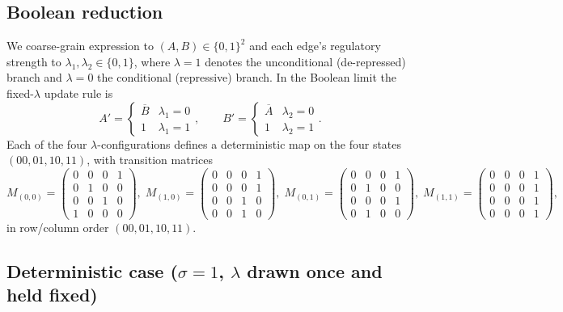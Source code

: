 \subsection{Boolean reduction}
 
We coarse-grain expression to $(A,B)\in\{0,1\}^2$ and each edge's regulatory
strength to $\lambda_{1},\lambda_{2}\in\{0,1\}$, where $\lambda=1$ denotes the
unconditional (de-repressed) branch and $\lambda=0$ the conditional (repressive)
branch. In the Boolean limit the fixed-$\lambda$ update rule is
\begin{equation}
  A' = \begin{cases}\overline{B} & \lambda_{1}=0\\[2pt] 1 & \lambda_{1}=1\end{cases},
  \qquad
  B' = \begin{cases}\overline{A} & \lambda_{2}=0\\[2pt] 1 & \lambda_{2}=1\end{cases}.
  \label{eq:boolupdate}
\end{equation}
Each of the four $\lambda$-configurations defines a deterministic map on the four
states $(00,01,10,11)$, with transition matrices
\begin{equation}
  M_{(0,0)}=\!\begin{pmatrix}0&0&0&1\\0&1&0&0\\0&0&1&0\\1&0&0&0\end{pmatrix}\!,\;
  M_{(1,0)}=\!\begin{pmatrix}0&0&0&1\\0&0&0&1\\0&0&1&0\\0&0&1&0\end{pmatrix}\!,\;
  M_{(0,1)}=\!\begin{pmatrix}0&0&0&1\\0&1&0&0\\0&0&0&1\\0&1&0&0\end{pmatrix}\!,\;
  M_{(1,1)}=\!\begin{pmatrix}0&0&0&1\\0&0&0&1\\0&0&0&1\\0&0&0&1\end{pmatrix}\!,
  \label{eq:configmaps}
\end{equation}
in row/column order $(00,01,10,11)$.
 
\subsection{Deterministic case ($\sigma=1$, $\lambda$ drawn once and held fixed)}
\label{sec:quenched}
 

